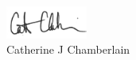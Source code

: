 \documentclass[11pt,a4paper]{letter}\usepackage[]{graphicx}\usepackage[]{color}
\begin{document}
\begin{letter}{}
 \includegraphics[width=0.2\textwidth]{Full_Signature.jpg} \\
 

\noindent Catherine J Chamberlain


\end{letter}
\end{document}

